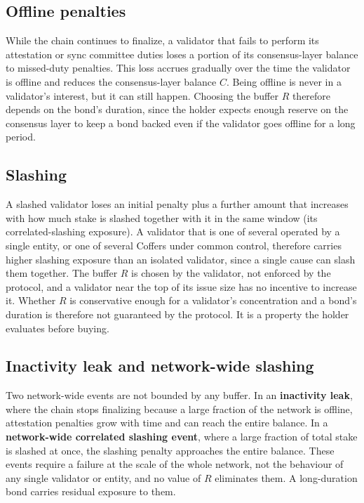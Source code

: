 \documentclass{article}
\begin{document}
\subsection{Offline penalties}
While the chain continues to finalize, a validator that fails to perform its attestation or sync committee duties loses a portion of its consensus-layer balance to missed-duty penalties. This loss accrues gradually over the time the validator is offline and reduces the consensus-layer balance \(C\). Being offline is never in a validator's interest, but it can still happen. Choosing the buffer \(R\) therefore depends on the bond's duration, since the holder expects enough reserve on the consensus layer to keep a bond backed even if the validator goes offline for a long period.

\subsection{Slashing}
A slashed validator loses an initial penalty plus a further amount that increases with how much stake is slashed together with it in the same window (its correlated-slashing exposure). A validator that is one of several operated by a single entity, or one of several Coffers under common control, therefore carries higher slashing exposure than an isolated validator, since a single cause can slash them together. The buffer \(R\) is chosen by the validator, not enforced by the protocol, and a validator near the top of its issue size has no incentive to increase it. Whether \(R\) is conservative enough for a validator's concentration and a bond's duration is therefore not guaranteed by the protocol. It is a property the holder evaluates before buying.

\subsection{Inactivity leak and network-wide slashing}
Two network-wide events are not bounded by any buffer. In an \textbf{inactivity leak}, where the chain stops finalizing because a large fraction of the network is offline, attestation penalties grow with time and can reach the entire balance. In a \textbf{network-wide correlated slashing event}, where a large fraction of total stake is slashed at once, the slashing penalty approaches the entire balance. These events require a failure at the scale of the whole network, not the behaviour of any single validator or entity, and no value of \(R\) eliminates them. A long-duration bond carries residual exposure to them.
\end{document}

